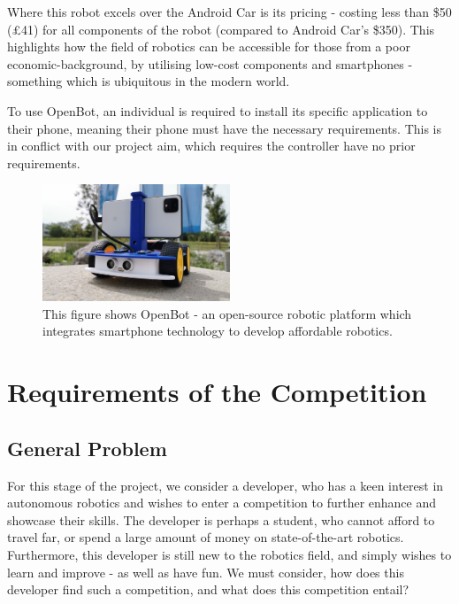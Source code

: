 \documentclass{l4proj}
\begin{document}
Where this robot excels over the Android Car is its pricing - costing less than \$50 (£41) for all components of the robot (compared to Android Car’s \$350). This highlights how the field of robotics can be accessible for those from a poor economic-background, by utilising low-cost components and smartphones - something which is ubiquitous in the modern world.

To use OpenBot, an individual is required to install its specific application to their phone, meaning their phone must have the necessary requirements. This is in conflict with our project aim, which requires the controller have no prior requirements.

\begin{figure}[!ht]
    \centering
    \includegraphics[width=0.50\textwidth]{images/openbot.jpg}
    \caption{This figure shows OpenBot - an open-source robotic platform which integrates smartphone technology to develop affordable robotics.}
    \label{fig:openbot}
\end{figure}


\chapter{Requirements of the Competition}
\section{General Problem}\label{sec:comp:general-problem}
For this stage of the project, we consider a developer, who has a keen interest in autonomous robotics and wishes to enter a competition to further enhance and showcase their skills. The developer is perhaps a student, who cannot afford to travel far, or spend a large amount of money on state-of-the-art robotics. Furthermore, this developer is still new to the robotics field, and simply wishes to learn and improve - as well as have fun. We must consider, how does this developer find such a competition, and what does this competition entail?
\end{document}
